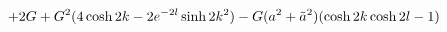 \begin{equation}
+2 G+G^2 (4 \cosh2k-2 e^{-2 l} \sinh2k^2)- G (a^2+\tilde{a}^2) (\cosh2k \cosh2l-1) \label{lagmanu} \\[2mm]
\end{equation}

